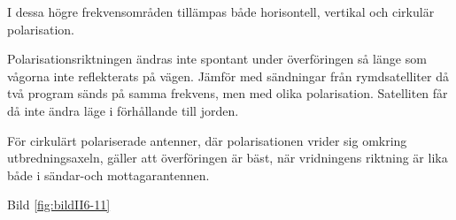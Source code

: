 I dessa högre frekvensområden tillämpas både horisontell, vertikal och
cirkulär polarisation.

Polarisationsriktningen ändras inte spontant under överföringen så
länge som vågorna inte reflekterats på vägen. Jämför med sändningar
från rymdsatelliter då två program sänds på samma frekvens, men med
olika polarisation. Satelliten får då inte ändra läge i förhållande
till jorden.

För cirkulärt polariserade antenner, där polarisationen vrider sig
omkring utbredningsaxeln, gäller att överföringen är bäst, när
vridningens riktning är lika både i sändar-och mottagarantennen.

Bild \ref{fig:bildII6-11}
